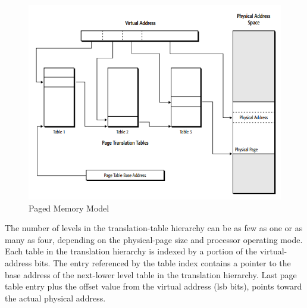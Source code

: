 \documentclass[a4paper,12pt]{report}
\begin{document}
\begin{figure}[H]
\centering
\includegraphics[scale=0.5]{./figures/paging.png}
\caption{Paged Memory Model}
\label{fig:paging.png}
\end{figure}



The number of levels in the translation-table hierarchy can be as few as one or as many as four, depending on the physical-page size and processor operating mode. Each table in the translation hierarchy is indexed by a portion of the virtual-address bits. The entry referenced by the table index contains a pointer to the base address of the next-lower level table in the translation hierarchy. Last page table entry plus the offset value from the virtual address (lsb bits), points toward the actual physical address.  
\end{document}

